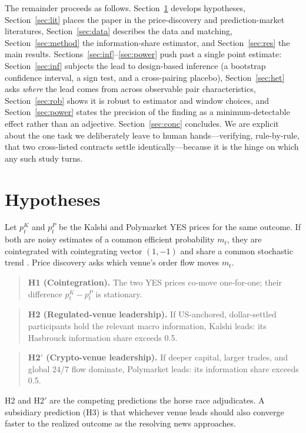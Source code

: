 \documentclass[12pt]{article}
\begin{document}
The remainder proceeds as follows. Section~\ref{sec:hyp} develops hypotheses,
Section~\ref{sec:lit} places the paper in the price-discovery and prediction-market
literatures, Section~\ref{sec:data} describes the data and matching,
Section~\ref{sec:method} the information-share estimator, and Section~\ref{sec:res} the
main results. Sections~\ref{sec:inf}--\ref{sec:power} push past a single point estimate:
Section~\ref{sec:inf} subjects the lead to design-based inference (a bootstrap confidence
interval, a sign test, and a cross-pairing placebo), Section~\ref{sec:het} asks
\emph{where} the lead comes from across observable pair characteristics,
Section~\ref{sec:rob} shows it is robust to estimator and window choices, and
Section~\ref{sec:power} states the precision of the finding as a minimum-detectable
effect rather than an adjective. Section~\ref{sec:conc} concludes. We are explicit about
the one task we deliberately leave to human hands---verifying, rule-by-rule, that two
cross-listed contracts settle identically---because it is the hinge on which any such study
turns.

\section{Hypotheses}\label{sec:hyp}
Let $p^K_t$ and $p^P_t$ be the Kalshi and Polymarket YES prices for the same outcome. If
both are noisy estimates of a common efficient probability $m_t$, they are cointegrated
with cointegrating vector $(1,-1)$ and share a common stochastic trend
\citep{engle1987,hasbrouck1995}. Price discovery asks which venue's order flow moves $m_t$.

\begin{quote}
\textbf{H1 (Cointegration).} The two YES prices co-move one-for-one; their difference
$p^K_t-p^P_t$ is stationary.
\end{quote}
\begin{quote}
\textbf{H2 (Regulated-venue leadership).} If US-anchored, dollar-settled participants hold
the relevant macro information, Kalshi leads: its Hasbrouck information share exceeds 0.5.
\end{quote}
\begin{quote}
\textbf{H2$'$ (Crypto-venue leadership).} If deeper capital, larger trades, and global 24/7
flow dominate, Polymarket leads: its information share exceeds 0.5.
\end{quote}
H2 and H2$'$ are the competing predictions the horse race adjudicates. A subsidiary
prediction (H3) is that whichever venue leads should also converge faster to the realized
outcome as the resolving news approaches.
\end{document}
